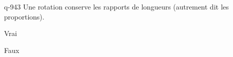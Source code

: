 \begin{truefalse}{q-943}
Une rotation conserve les rapports de longueurs (autrement dit les proportions).
\item* Vrai
\item Faux
\end{truefalse}

